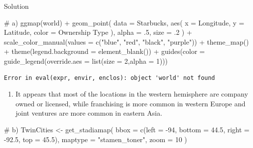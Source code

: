 \documentclass[
  letterpaper,
  DIV=11,
  numbers=noendperiod]{scrreprt}
\newenvironment{Shaded}{\begin{snugshade}}{\end{snugshade}}
\newcommand{\AttributeTok}[1]{\textcolor[rgb]{0.40,0.45,0.13}{#1}}
\newcommand{\CommentTok}[1]{\textcolor[rgb]{0.37,0.37,0.37}{#1}}
\newcommand{\DecValTok}[1]{\textcolor[rgb]{0.68,0.00,0.00}{#1}}
\newcommand{\FloatTok}[1]{\textcolor[rgb]{0.68,0.00,0.00}{#1}}
\newcommand{\FunctionTok}[1]{\textcolor[rgb]{0.28,0.35,0.67}{#1}}
\newcommand{\NormalTok}[1]{\textcolor[rgb]{0.00,0.23,0.31}{#1}}
\newcommand{\OtherTok}[1]{\textcolor[rgb]{0.00,0.23,0.31}{#1}}
\newcommand{\SpecialCharTok}[1]{\textcolor[rgb]{0.37,0.37,0.37}{#1}}
\newcommand{\StringTok}[1]{\textcolor[rgb]{0.13,0.47,0.30}{#1}}
\providecommand{\tightlist}{%
  \setlength{\itemsep}{0pt}\setlength{\parskip}{0pt}}\usepackage{longtable,booktabs,array}
\begin{document}
Solution

\begin{Shaded}
\begin{Highlighting}[]
\CommentTok{\# a)}
\FunctionTok{ggmap}\NormalTok{(world) }\SpecialCharTok{+}
  \FunctionTok{geom\_point}\NormalTok{(}
    \AttributeTok{data =}\NormalTok{ Starbucks,}
    \FunctionTok{aes}\NormalTok{(}
      \AttributeTok{x =}\NormalTok{ Longitude,}
      \AttributeTok{y =}\NormalTok{ Latitude,}
      \AttributeTok{color =} \StringTok{\textasciigrave{}}\AttributeTok{Ownership Type}\StringTok{\textasciigrave{}}
\NormalTok{    ),}
    \AttributeTok{alpha =}\NormalTok{ .}\DecValTok{5}\NormalTok{,}
    \AttributeTok{size =}\NormalTok{ .}\DecValTok{2}
\NormalTok{  ) }\SpecialCharTok{+}
  \FunctionTok{scale\_color\_manual}\NormalTok{(}\AttributeTok{values =} \FunctionTok{c}\NormalTok{(}\StringTok{"blue"}\NormalTok{, }\StringTok{"red"}\NormalTok{, }\StringTok{"black"}\NormalTok{, }\StringTok{"purple"}\NormalTok{)) }\SpecialCharTok{+}
  \FunctionTok{theme\_map}\NormalTok{() }\SpecialCharTok{+}
  \FunctionTok{theme}\NormalTok{(}\AttributeTok{legend.background =} \FunctionTok{element\_blank}\NormalTok{()) }\SpecialCharTok{+}
  \FunctionTok{guides}\NormalTok{(}\AttributeTok{color =} \FunctionTok{guide\_legend}\NormalTok{(}\AttributeTok{override.aes =} \FunctionTok{list}\NormalTok{(}\AttributeTok{size =} \DecValTok{2}\NormalTok{,}\AttributeTok{alpha =} \DecValTok{1}\NormalTok{)))}
\end{Highlighting}
\end{Shaded}

\begin{verbatim}
Error in eval(expr, envir, enclos): object 'world' not found
\end{verbatim}

\begin{enumerate}
\def\labelenumi{\alph{enumi}.}
\tightlist
\item
  It appears that most of the locations in the western hemisphere are
  company owned or licensed, while franchising is more common in western
  Europe and joint ventures are more common in eastern Asia.
\end{enumerate}

\begin{Shaded}
\begin{Highlighting}[]
\CommentTok{\# b)}
\NormalTok{TwinCities }\OtherTok{\textless{}{-}} \FunctionTok{get\_stadiamap}\NormalTok{(}
  \AttributeTok{bbox =} \FunctionTok{c}\NormalTok{(}\AttributeTok{left =} \SpecialCharTok{{-}}\DecValTok{94}\NormalTok{, }\AttributeTok{bottom =} \FloatTok{44.5}\NormalTok{, }\AttributeTok{right =} \SpecialCharTok{{-}}\FloatTok{92.5}\NormalTok{, }\AttributeTok{top =} \FloatTok{45.5}\NormalTok{),}
  \AttributeTok{maptype =} \StringTok{"stamen\_toner"}\NormalTok{,}
  \AttributeTok{zoom =} \DecValTok{10}
\NormalTok{)}
\end{Highlighting}
\end{Shaded}
\end{document}
